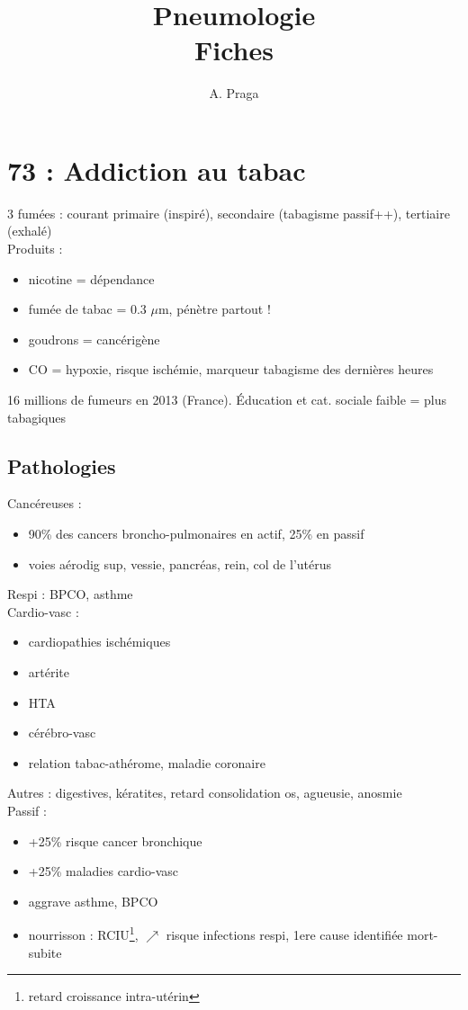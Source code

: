 \documentclass{article}
\title{Pneumologie\\
\large Fiches}
\author{A. Praga}
\begin{document}
\maketitle
\tableofcontents



\section{73 : Addiction au tabac}
3 fumées : courant primaire (inspiré), secondaire (tabagisme passif++), tertiaire (exhalé)\\
Produits :
\begin{itemize}
  \item nicotine = dépendance
  \item fumée de tabac = 0.3 $\mu$m, pénètre partout !
  \item goudrons = cancérigène
  \item CO = hypoxie, risque ischémie, marqueur tabagisme des dernières heures
\end{itemize}
16 millions de fumeurs en 2013 (France). Éducation et cat. sociale faible = plus
tabagiques
\subsection{Pathologies}
Cancéreuses :
\begin{itemize}
  \item 90\% des cancers broncho-pulmonaires en actif, 25\% en passif
  \item voies aérodig sup, vessie, pancréas, rein, col de l'utérus
\end{itemize}
Respi : BPCO, asthme\\
Cardio-vasc : 
\begin{itemize}
  \item cardiopathies ischémiques
  \item artérite
  \item HTA
  \item cérébro-vasc
  \item relation tabac-athérome, maladie coronaire
\end{itemize}
Autres : digestives, kératites, retard consolidation os, agueusie, anosmie\\
Passif :
\begin{itemize}
  \item +25\% risque cancer bronchique
  \item +25\% maladies cardio-vasc
  \item aggrave asthme, BPCO
  \item nourrisson : RCIU\footnote{retard croissance intra-utérin}, \(\nearrow\) risque
    infections respi, 1ere cause identifiée mort-subite
\end{itemize}
\end{document}

